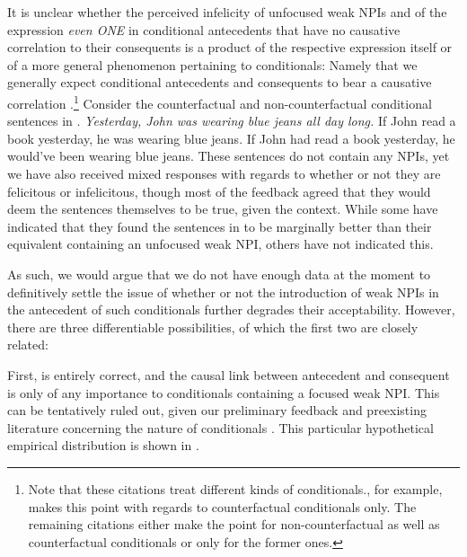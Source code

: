 It is unclear whether the perceived infelicity of unfocused weak NPIs and of the expression \textit{even \MakeUppercase{one}} in conditional antecedents that have no causative correlation to their consequents is a product of the respective expression itself or of a more general phenomenon pertaining to conditionals: Namely that we generally expect conditional antecedents and consequents to bear a causative correlation \parencite[see, among many others,][]{Douven2008,Schulz2011,Spohn2013,vanRooij2022}.\footnote{Note that these citations treat different kinds of conditionals.\textcite{Schulz2011}, for example, makes this point with regards to counterfactual conditionals only. The remaining citations either make the point for non-counterfactual as well as counterfactual conditionals or only for the former ones.} Consider the counterfactual and non-counterfactual conditional sentences in .
\pex\label{ex:bluejeansconditionals}
\textit{Yesterday, John was wearing blue jeans all day long.}
\a\ljudge{\%} If John read a book yesterday, he was wearing blue jeans.
\a\ljudge{\%} If John had read a book yesterday, he would've been wearing blue jeans.
\xe
These sentences do not contain any NPIs, yet we have also received mixed responses with regards to whether or not they are felicitous or infelicitous, though most of the feedback agreed that they would deem the sentences themselves to be true, given the context. While some have indicated that they found the sentences in  to be marginally better than their equivalent containing an unfocused weak NPI, others have not indicated this. 

As such, we would argue that we do not have enough data at the moment to definitively settle the issue of whether or not the introduction of weak NPIs in the antecedent of such conditionals further degrades their acceptability. However, there are three differentiable possibilities, of which the first two are closely related: 

First, \textcite{Crnic2014-dogma} is entirely correct, and the causal link between antecedent and consequent is only of any importance to conditionals containing a focused weak NPI. This can be tentatively ruled out, given our preliminary feedback and preexisting literature concerning the nature of conditionals \parencite{Douven2008,Schulz2011,Spohn2013,vanRooij2022}. This particular hypothetical empirical distribution is shown in .
\begin{table}[!htb]
\end{table}

